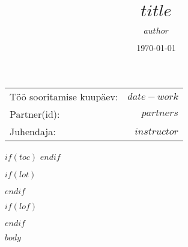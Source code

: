 \documentclass[
	a4paper, %
	12pt, %
	onecolumn,
	twoside
]{CSUniSchoolLabReport}
\title{$title$ \\ \sc{$subtitle$}} %
\author{$author$} %
\date{\today} %
\begin{document}
  \maketitle %

  \begin{center}
  	\begin{tabular}{l r}
  		Töö sooritamise kuupäev: & $date-work$ \\ %
  		Partner(id): & $partners$ \\ %
  		Juhendaja: & $instructor$ %
  	\end{tabular}
  \end{center}














  $if(toc)$
    \setcounter{secnumdepth}{$toc-depth$}
    \setcounter{tocdepth}{$toc-depth$}
    \tableofcontents
  $endif$

  $if(lot)$
    \listoftables
  $endif$

  $if(lof)$
    \listoffigures
  $endif$

  $body$
\end{document}
